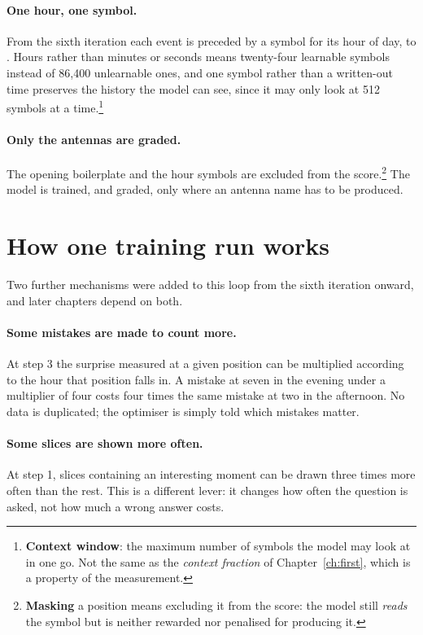 \paragraph{One hour, one symbol.} From the sixth iteration each event is preceded
by a symbol for its hour of day,  to . Hours rather than
minutes or seconds means twenty-four learnable symbols instead of 86{,}400
unlearnable ones, and one symbol rather than a written-out time preserves the
history the model can see, since it may only look at 512 symbols at a
time.\footnote{\textbf{Context window}: the maximum number of symbols the model
may look at in one go. Not the same as the \emph{context fraction} of
Chapter~\ref{ch:first}, which is a property of the measurement.}

\paragraph{Only the antennas are graded.} The opening boilerplate and the hour
symbols are excluded from the score.\footnote{\textbf{Masking} a position means
excluding it from the score: the model still \emph{reads} the symbol but is
neither rewarded nor penalised for producing it.} The model is trained, and
graded, only where an antenna name has to be produced.

\section{How one training run works}



Two further mechanisms were added to this loop from the sixth iteration onward,
and later chapters depend on both.

\paragraph{Some mistakes are made to count more.} At step 3 the surprise measured
at a given position can be multiplied according to the hour that position falls
in. A mistake at seven in the evening under a multiplier of four costs four times
the same mistake at two in the afternoon. No data is duplicated; the optimiser is
simply told which mistakes matter.

\paragraph{Some slices are shown more often.} At step 1, slices containing an
interesting moment can be drawn three times more often than the rest. This is a
different lever: it changes how often the question is asked, not how much a wrong
answer costs.


